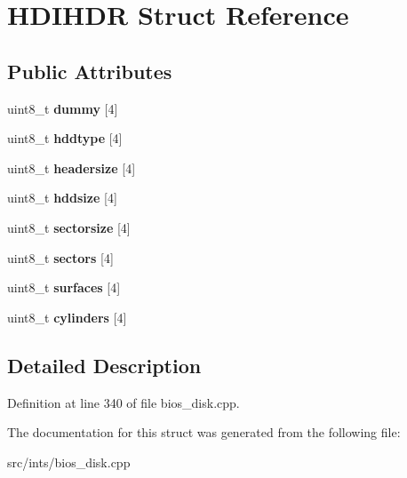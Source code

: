 \hypertarget{structHDIHDR}{\section{H\-D\-I\-H\-D\-R Struct Reference}
\label{structHDIHDR}
}
\subsection*{Public Attributes}
\begin{DoxyCompactItemize}
\item 
\hypertarget{structHDIHDR_ae41c262463f3201e383a1c9390ae901c}{uint8\-\_\-t {\bfseries dummy} \mbox{[}4\mbox{]}}\label{structHDIHDR_ae41c262463f3201e383a1c9390ae901c}

\item 
\hypertarget{structHDIHDR_ab51b532bb68c10726d57f635bb77dc4d}{uint8\-\_\-t {\bfseries hddtype} \mbox{[}4\mbox{]}}\label{structHDIHDR_ab51b532bb68c10726d57f635bb77dc4d}

\item 
\hypertarget{structHDIHDR_ab03e0699debea645f1ba0571ddedf82a}{uint8\-\_\-t {\bfseries headersize} \mbox{[}4\mbox{]}}\label{structHDIHDR_ab03e0699debea645f1ba0571ddedf82a}

\item 
\hypertarget{structHDIHDR_a552e396437dfc751af75133fc9abd875}{uint8\-\_\-t {\bfseries hddsize} \mbox{[}4\mbox{]}}\label{structHDIHDR_a552e396437dfc751af75133fc9abd875}

\item 
\hypertarget{structHDIHDR_a2dc5f3e10810fa24566f03f8b26dab4f}{uint8\-\_\-t {\bfseries sectorsize} \mbox{[}4\mbox{]}}\label{structHDIHDR_a2dc5f3e10810fa24566f03f8b26dab4f}

\item 
\hypertarget{structHDIHDR_aa8388e85e4ef3007467293eea28e0082}{uint8\-\_\-t {\bfseries sectors} \mbox{[}4\mbox{]}}\label{structHDIHDR_aa8388e85e4ef3007467293eea28e0082}

\item 
\hypertarget{structHDIHDR_a74ee482205337db4273020bef91f3056}{uint8\-\_\-t {\bfseries surfaces} \mbox{[}4\mbox{]}}\label{structHDIHDR_a74ee482205337db4273020bef91f3056}

\item 
\hypertarget{structHDIHDR_a61459f45085bcacd0325cc64862fc396}{uint8\-\_\-t {\bfseries cylinders} \mbox{[}4\mbox{]}}\label{structHDIHDR_a61459f45085bcacd0325cc64862fc396}

\end{DoxyCompactItemize}


\subsection{Detailed Description}


Definition at line 340 of file bios\-\_\-disk.\-cpp.



The documentation for this struct was generated from the following file\-:\begin{DoxyCompactItemize}
\item 
src/ints/bios\-\_\-disk.\-cpp\end{DoxyCompactItemize}
